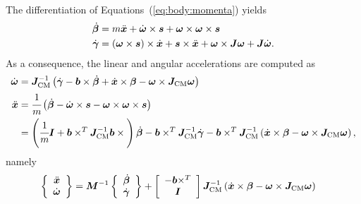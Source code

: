 \documentclass[10pt,dvips,fleqn,subeqn]{report}
\newcommand{\T}[1]{\bm{#1}}
\newcommand{\TT}[1]{\bm{#1}}
\begin{document}
The differentiation of Equations~(\ref{eq:body:momenta}) yields
\begin{subequations}
\begin{align}
	\dot{\T{\beta}}
	&=
	m \ddot{\T{x}}
	+
	\dot{\T{\omega}} \times \T{s}
	+
	\T{\omega} \times \T{\omega} \times \T{s}
	\\
	\dot{\T{\gamma}}
	&=
	\plbr{\T{\omega}\times \T{s}} \times \dot{\T{x}}
	+
	\T{s} \times \ddot{\T{x}}
	+
	\T{\omega} \times \TT{J} \T{\omega}
	+
	\TT{J} \dot{\T{\omega}} .
\end{align}
\end{subequations}
As a consequence, the linear and angular accelerations are computed as
\begin{align}
	\dot{\T{\omega}}
	&= \TT{J}_{\text{CM}}^{-1} \plbr{
		\dot{\T{\gamma}}
		- \T{b} \times \dot{\T{\beta}}
		+ \dot{\T{x}} \times \T{\beta}
		- \T{\omega} \times \TT{J}_{\text{CM}} \T{\omega}
	} \\
	\ddot{\T{x}}
	&= \cfrac{1}{m}\plbr{
		\dot{\T{\beta}}
		- \dot{\T{\omega}} \times \T{s}
		- \T{\omega} \times \T{\omega} \times \T{s}
	}
	\nonumber \\
	&= \plbr{
		\cfrac{1}{m} \TT{I}
		+
		\T{b}\times^T \TT{J}_\text{CM}^{-1} \T{b}\times{}
	} \dot{\T{\beta}}
	-
	\T{b}\times^T \TT{J}_\text{CM}^{-1} \dot{\T{\gamma}}
	-
	\T{b}\times^T \TT{J}_\text{CM}^{-1} \plbr{
		\dot{\T{x}}\times\T{\beta}
		- \T{\omega}\times\TT{J}_\text{CM} \T{\omega}
	}
	,
\end{align}
namely
\begin{align}
	\cubr{\cvvect{
		\ddot{\T{x}}
		\\
		\dot{\T{\omega}}
	}}
	&=
	\TT{M}^{-1} \cubr{\cvvect{
		\dot{\T{\beta}}
		\\
		\dot{\T{\gamma}}
	}}
	+
	\sqbr{\cvvect{
		- \T{b}\times^T
		\\
		\TT{I}
	}} \TT{J}_\text{CM}^{-1} \plbr{
		\dot{\T{x}}\times\T{\beta}
		-
		\T{\omega}\times\TT{J}_\text{CM} \T{\omega}
	}
\end{align}
\end{document}
